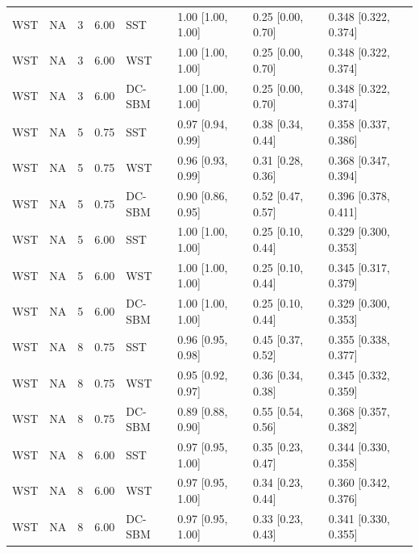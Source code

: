 \begin{table}
\begin{tabular}[t]{llrrllll}
WST & NA & 3 & 6.00 & SST & 1.00 [1.00, 1.00] & 0.25 [0.00, 0.70] & 0.348 [0.322, 0.374]\\
WST & NA & 3 & 6.00 & WST & 1.00 [1.00, 1.00] & 0.25 [0.00, 0.70] & 0.348 [0.322, 0.374]\\
\addlinespace
WST & NA & 3 & 6.00 & DC-SBM & 1.00 [1.00, 1.00] & 0.25 [0.00, 0.70] & 0.348 [0.322, 0.374]\\
WST & NA & 5 & 0.75 & SST & 0.97 [0.94, 0.99] & 0.38 [0.34, 0.44] & 0.358 [0.337, 0.386]\\
WST & NA & 5 & 0.75 & WST & 0.96 [0.93, 0.99] & 0.31 [0.28, 0.36] & 0.368 [0.347, 0.394]\\
WST & NA & 5 & 0.75 & DC-SBM & 0.90 [0.86, 0.95] & 0.52 [0.47, 0.57] & 0.396 [0.378, 0.411]\\
WST & NA & 5 & 6.00 & SST & 1.00 [1.00, 1.00] & 0.25 [0.10, 0.44] & 0.329 [0.300, 0.353]\\
\addlinespace
WST & NA & 5 & 6.00 & WST & 1.00 [1.00, 1.00] & 0.25 [0.10, 0.44] & 0.345 [0.317, 0.379]\\
WST & NA & 5 & 6.00 & DC-SBM & 1.00 [1.00, 1.00] & 0.25 [0.10, 0.44] & 0.329 [0.300, 0.353]\\
WST & NA & 8 & 0.75 & SST & 0.96 [0.95, 0.98] & 0.45 [0.37, 0.52] & 0.355 [0.338, 0.377]\\
WST & NA & 8 & 0.75 & WST & 0.95 [0.92, 0.97] & 0.36 [0.34, 0.38] & 0.345 [0.332, 0.359]\\
WST & NA & 8 & 0.75 & DC-SBM & 0.89 [0.88, 0.90] & 0.55 [0.54, 0.56] & 0.368 [0.357, 0.382]\\
\addlinespace
WST & NA & 8 & 6.00 & SST & 0.97 [0.95, 1.00] & 0.35 [0.23, 0.47] & 0.344 [0.330, 0.358]\\
WST & NA & 8 & 6.00 & WST & 0.97 [0.95, 1.00] & 0.34 [0.23, 0.44] & 0.360 [0.342, 0.376]\\
WST & NA & 8 & 6.00 & DC-SBM & 0.97 [0.95, 1.00] & 0.33 [0.23, 0.43] & 0.341 [0.330, 0.355]\\
\bottomrule
\end{tabular}
\end{table}

